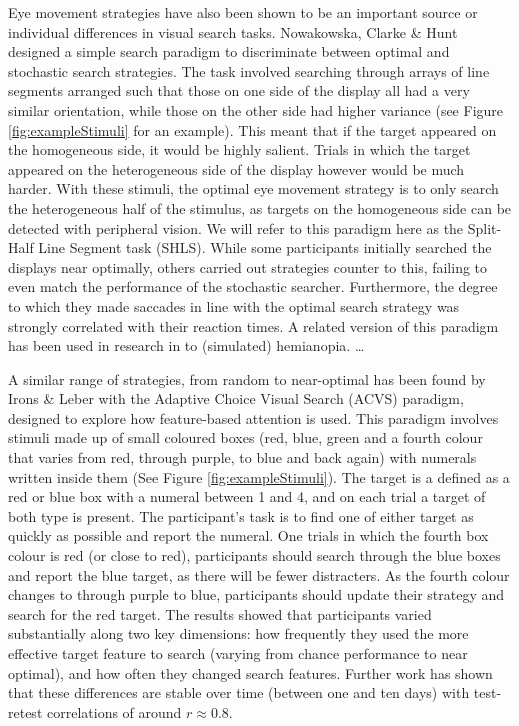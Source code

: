 \documentclass[]{rsos}%
\begin{document}
Eye movement strategies have also been shown to be an important source or individual differences in visual search tasks. Nowakowska, Clarke \& Hunt\cite{nowakowska2017} designed a simple search paradigm to discriminate between optimal\cite{najemnik-geisler2008} and stochastic \cite{clarke2016} search strategies. The task involved searching through arrays of line segments arranged such that those on one side of the display all had a very similar orientation, while those on the other side had higher variance (see Figure \ref{fig:exampleStimuli} for an example). This meant that if the target appeared on the homogeneous side, it would be highly salient. Trials in which the target appeared on the heterogeneous side of the display however would be much harder. With these stimuli, the optimal eye movement strategy is to only search the heterogeneous half of the stimulus, as targets on the homogeneous side can be detected with peripheral vision. We will refer to this paradigm here as the Split-Half Line Segment task (SHLS). While some participants initially searched the displays near optimally, others carried out strategies counter to this, failing to even match the performance of the stochastic searcher. Furthermore, the degree to which they made saccades in line with the optimal search strategy was strongly correlated with their reaction times. A related version of this paradigm has been used in research in to (simulated) hemianopia\cite{nowakowska2016,nowakowska2018}. \ldots

A similar range of strategies, from random to near-optimal has been found by Irons \& Leber with the Adaptive Choice Visual Search (ACVS) paradigm\cite{irons-leber2016}, designed to explore how feature-based attention is used. This paradigm involves stimuli made up of small coloured boxes (red, blue, green and a fourth colour that varies from red, through purple, to blue and back again) with numerals written inside them (See Figure \ref{fig:exampleStimuli}). The target is a defined as a red or blue box with a numeral between 1 and 4, and on each trial a target of both type is present. The participant's task is to find one of either target as quickly as possible and report the numeral. One trials in which the fourth box colour is red (or close to red), participants should search through the blue boxes and report the blue target, as there will be fewer distracters. As the fourth colour changes to through purple to blue, participants should update their strategy and search for the red target. The results showed that participants varied substantially along two key dimensions: how frequently they used the more effective target feature to search (varying from chance performance to near optimal), and how often they changed search features. Further work has shown that these differences are stable over time (between one and ten days) with test-retest correlations of around $r \approx 0.8$\cite{irons-leber2018}.
\end{document}

